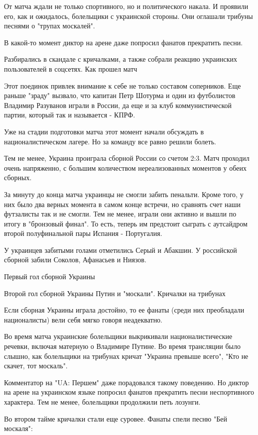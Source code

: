 От матча ждали не только спортивного, но и политического накала. И проявили его, как и ожидалось, болельщики с украинской стороны. Они оглашали трибуны песнями о "трупах москалей". 

В какой-то момент диктор на арене даже попросил фанатов прекратить песни.

Разбирались в скандале с кричалками, а также собрали реакцию украинских пользователей в соцсетях.
Как прошел матч

Этот поединок привлек внимание к себе не только составом соперников. Еще раньше "зраду" вызвало, что капитан Петр Шотурма и один из футболистов Владимир Разуванов играли в России, да еще и за клуб коммунистической партии, который так и называется - КПРФ.

Уже на стадии подготовки матча этот момент начали обсуждать в националистическом лагере. Но за команду все равно решили болеть. 

Тем не менее, Украина проиграла сборной России со счетом 2:3. Матч проходил очень напряженно, с большим количеством нереализованных моментов у обеих сборных.

За минуту до конца матча украинцы не смогли забить пенальти. Кроме того, у них было два верных момента в самом конце встречи, но сравнять счет наши футзалисты так и не смогли. Тем не менее, играли они активно и вышли по итогу в "бронзовый финал". То есть, теперь им предстоит сыграть с аутсайдром второй полуфинальной пары Испания - Португалия.

У украинцев забитыми голами отметились Серый и Абакшин. У российской сборной забили Соколов, Афанасьев и Ниязов.

Первый гол сборной Украины

Второй гол сборной Украины
Путин и "москали". Кричалки на трибунах

Если сборная Украины играла достойно, то ее фанаты (среди них преобладали националисты) вели себя мягко говоря неадекватно.

Во время матча украинские болельщики выкрикивали националистические речевки, включая матерную о Владимире Путине. Во время трансляции было слышно, как болельщики на трибунах кричат "Украина превыше всего", "Кто не скачет, тот москаль".

Комментатор на "UA: Першем" даже порадовался такому поведению. Но диктор на арене на украинском языке попросил фанатов прекратить песни неспортивного характера. Тем не менее, болельщики продолжили петь лозунги.

Во втором тайме кричалки стали еще суровее. Фанаты спели песню "Бей москаля":

